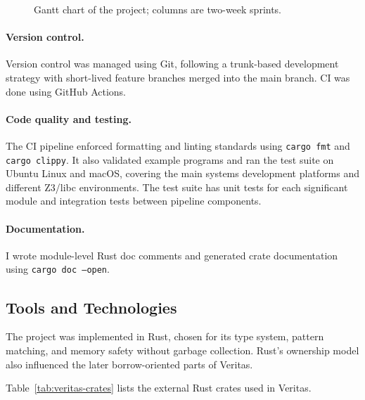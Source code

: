 \begin{figure}[H]
  \captionsetup{
    aboveskip=4pt,
    belowskip=-8pt
  }
  \caption{Gantt chart of the project; columns are two-week sprints.}
  \label{fig:project-gantt}
\end{figure}

\paragraph{Version control.} Version control was managed using Git, following a trunk-based development strategy with short-lived feature branches merged into the main branch. CI was done using GitHub Actions.

\paragraph{Code quality and testing.} The CI pipeline enforced formatting and linting standards using \texttt{cargo fmt} and \texttt{cargo clippy}. It also validated example programs and ran the test suite on Ubuntu Linux and macOS, covering the main systems development platforms and different Z3/libc environments. The test suite has unit tests for each significant module and integration tests between pipeline components.

\paragraph{Documentation.} I wrote module-level Rust doc comments and generated crate documentation using \texttt{cargo doc --open}.

\subsection{Tools and Technologies}
The project was implemented in Rust, chosen for its type system, pattern matching, and memory safety without garbage collection. Rust's ownership model also influenced the later borrow-oriented parts of Veritas.

Table~\ref{tab:veritas-crates} lists the external Rust crates used in Veritas.

